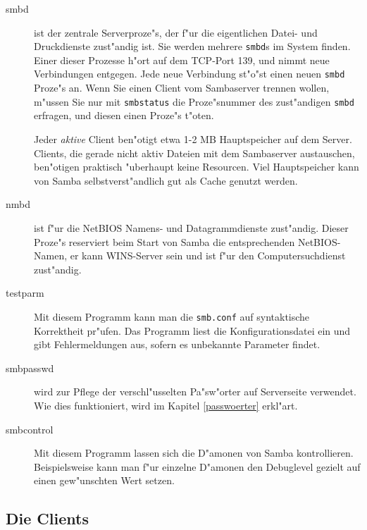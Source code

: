 \documentclass{scrartcl}\usepackage{pslatex}\typearea{12}
\newcommand{\prog}{\texttt}
\newcommand{\dateistyle}{\texttt}
\begin{document}
\begin{description}
  
\item[smbd] ist der zentrale Serverproze"s, der f"ur die eigentlichen
  Datei- und Druckdienste zust"andig ist. Sie werden mehrere
  \prog{smbd}s im System finden. Einer dieser Prozesse h"ort auf dem
  TCP-Port 139, und nimmt neue Verbindungen entgegen. Jede neue
  Verbindung st"o"st einen neuen \prog{smbd} Proze"s an. Wenn Sie
  einen Client vom Sambaserver trennen wollen, m"ussen Sie nur mit
  \prog{smbstatus} die Proze"snummer des zust"andigen \prog{smbd}
  erfragen, und diesen einen Proze"s t"oten.
  
  Jeder \emph{aktive} Client ben"otigt etwa 1-2 MB Hauptspeicher auf dem
  Server. Clients, die gerade nicht aktiv Dateien mit dem Sambaserver
  austauschen, ben"otigen praktisch "uberhaupt keine Resourcen. Viel
  Hauptspeicher kann von Samba selbstverst"andlich gut als Cache
  genutzt werden.
  
\item[nmbd] ist f"ur die NetBIOS Namens- und Datagrammdienste
  zust"andig. Dieser Proze"s reserviert beim Start von Samba die
  entsprechenden NetBIOS-Namen, er kann WINS-Server sein und ist f"ur
  den Computersuchdienst zust"andig.
  
\item[testparm] Mit diesem Programm kann man die \dateistyle{smb.conf}
  auf syntaktische Korrektheit pr"ufen. Das Programm liest die
  Konfigurationsdatei ein und gibt Fehlermeldungen aus, sofern es
  unbekannte Parameter findet.
  
\item[smbpasswd] wird zur Pflege der verschl"usselten Pa"sw"orter auf
  Serverseite verwendet. Wie dies funktioniert, wird im Kapitel
  \ref{passwoerter} erkl"art.
  
\item[smbcontrol] Mit diesem Programm lassen sich die D"amonen von
  Samba kontrollieren. Beispielsweise kann man f"ur einzelne D"amonen
  den Debuglevel gezielt auf einen gew"unschten Wert setzen.

\end{description}

\subsection{Die Clients}
\end{document}
